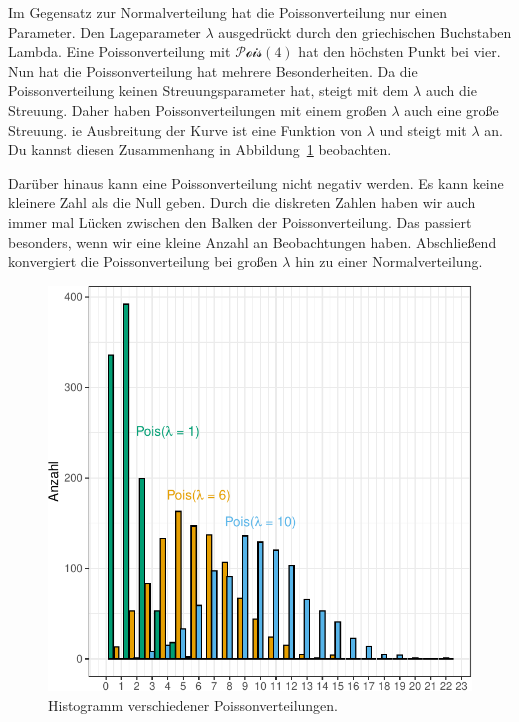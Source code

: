 \documentclass[
  letterpaper,
]{scrbook}
\begin{document}
Im Gegensatz zur Normalverteilung hat die Poissonverteilung nur einen
Parameter. Den Lageparameter \(\lambda\) ausgedrückt durch den
griechischen Buchstaben Lambda. Eine Poissonverteilung mit
\(\mathcal{Pois}(4)\) hat den höchsten Punkt bei vier. Nun hat die
Poissonverteilung hat mehrere Besonderheiten. Da die Poissonverteilung
keinen Streuungsparameter hat, steigt mit dem \(\lambda\) auch die
Streuung. Daher haben Poissonverteilungen mit einem großen \(\lambda\)
auch eine große Streuung. ie Ausbreitung der Kurve ist eine Funktion von
\(\lambda\) und steigt mit \(\lambda\) an. Du kannst diesen Zusammenhang
in Abbildung~\ref{fig-pois-00} beobachten.

Darüber hinaus kann eine Poissonverteilung nicht negativ werden. Es kann
keine kleinere Zahl als die Null geben. Durch die diskreten Zahlen haben
wir auch immer mal Lücken zwischen den Balken der Poissonverteilung. Das
passiert besonders, wenn wir eine kleine Anzahl an Beobachtungen haben.
Abschließend konvergiert die Poissonverteilung bei großen \(\lambda\)
hin zu einer Normalverteilung.

\begin{figure}

{\centering \includegraphics{./eda-distribution_files/figure-pdf/fig-pois-00-1.pdf}

}

\caption{\label{fig-pois-00}Histogramm verschiedener
Poissonverteilungen.}

\end{figure}
\end{document}
